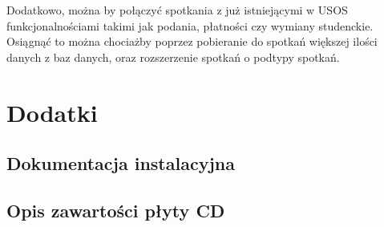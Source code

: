 \documentclass[licencjacka]{pracamgr}
\begin{document}
Dodatkowo, można by połączyć spotkania z już istniejącymi w USOS funkcjonalnościami takimi jak podania, płatności czy wymiany studenckie. Osiągnąć to można chociażby poprzez pobieranie do spotkań większej ilości danych z baz danych, oraz rozszerzenie spotkań o podtypy spotkań.

\chapter{Dodatki} \label{chap:dodatki}
\section{Dokumentacja instalacyjna}
\section{Opis zawartości płyty CD}
\end{document}
